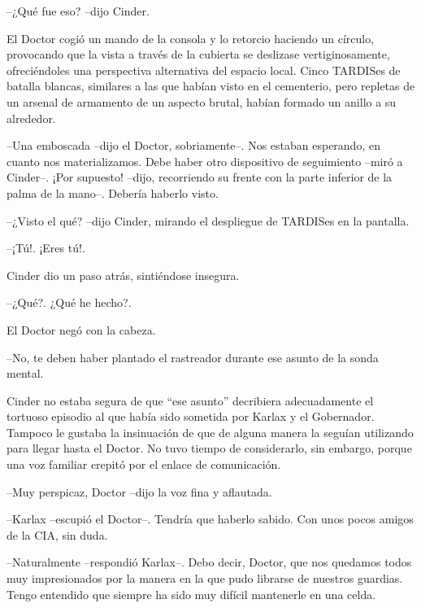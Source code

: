 --¿Qué fue eso? --dijo Cinder.



El Doctor cogió un mando de la consola y lo retorcio haciendo un círculo, provocando que la vista a través de la cubierta se deslizase vertiginosamente, ofreciéndoles una perspectiva alternativa del espacio local. Cinco TARDISes de batalla blancas, similares a las que habían visto en el cementerio, pero repletas de un arsenal de armamento de un aspecto brutal, habían formado un anillo a su alrededor.



--Una emboscada --dijo el Doctor, sobriamente--. Nos estaban esperando, en cuanto nos materializamos. Debe haber otro dispositivo de seguimiento --miró a Cinder--. ¡Por supuesto! --dijo, recorriendo su frente con la parte inferior de la palma de la mano--. Debería haberlo visto.

--¿Visto el qué? --dijo Cinder, mirando el despliegue de TARDISes en la pantalla.

--¡Tú!. ¡Eres tú!.



Cinder dio un paso atrás, sintiéndose insegura. 



--¿Qué?. ¿Qué he hecho?.



El Doctor negó con la cabeza. 



--No, te deben haber plantado el rastreador durante ese asunto de la sonda mental.



Cinder no estaba segura de que ``ese asunto'' decribiera adecuadamente el tortuoso episodio al que había sido sometida por Karlax y el Gobernador. Tampoco le gustaba la insinuación de que de alguna manera la seguían utilizando para llegar hasta el Doctor. No tuvo tiempo de considerarlo, sin embargo, porque una voz familiar crepitó por el enlace de comunicación.



--Muy perspicaz, Doctor --dijo la voz fina y aflautada.

--Karlax --escupió el Doctor--. Tendría que haberlo sabido. Con unos pocos amigos de la CIA, sin duda.

--Naturalmente --respondió Karlax--. Debo decir, Doctor, que nos quedamos todos muy impresionados por la manera en la que pudo librarse de nuestros guardias. Tengo entendido que siempre ha sido muy difícil mantenerle en una celda.



